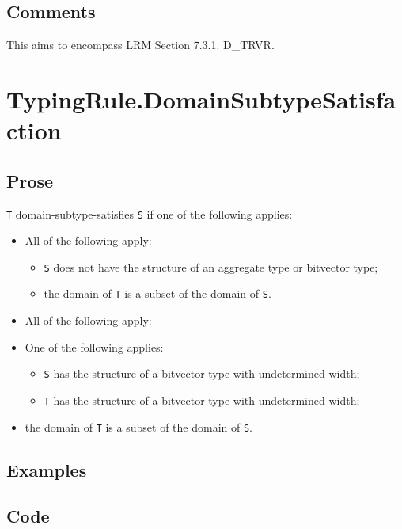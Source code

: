\documentclass{book}
\begin{document}
\subsection{Comments}
  This aims to encompass LRM Section 7.3.1. D\_TRVR.

\section{TypingRule.DomainSubtypeSatisfaction}

\subsection{Prose}
 \texttt{T} domain-subtype-satisfies \texttt{S} if one of the following applies:
 \begin{itemize}
 \item All of the following apply:
    \begin{itemize}
    \item \texttt{S} does not have the structure of an aggregate type or bitvector type;
    \item the domain of \texttt{T} is a subset of the domain of \texttt{S}.
    \end{itemize}

  \item All of the following apply:
    \item One of the following applies:
      \begin{itemize}
      \item \texttt{S} has the structure of a bitvector type with undetermined width;
      \item \texttt{T} has the structure of a bitvector type with undetermined width;
      \end{itemize}
   \item the domain of \texttt{T} is a subset of the domain of \texttt{S}.
  \end{itemize}

  \subsection{Examples}

  \subsection{Code}
\end{document}
